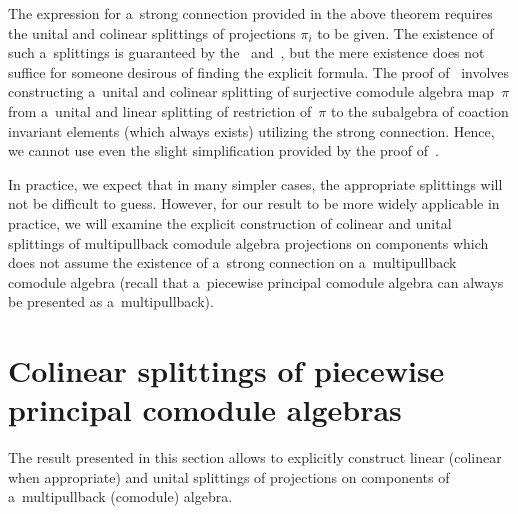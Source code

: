 The expression for a~strong connection provided in the above theorem requires the unital and colinear splittings of
projections $\pi_i$ to be given.
The existence of such a~splittings is guaranteed by the~\cite[Lemma~3.1]{hkmz11} and~\cite[Theorem~3.3]{hkmz11}, but the
mere existence does not suf\/f\/ice for someone desirous of f\/inding the explicit formula.
The proof of~\cite[Lemma~3.1]{hkmz11} involves constructing a~unital and colinear splitting of surjective comodule
algebra map~$\pi$ from a~unital and linear splitting of restriction of~$\pi$ to the subalgebra of coaction invariant
elements (which always exists) utilizing the strong connection.
Hence, we cannot use even the slight simplif\/ication provided by the proof of~\cite[Lemma~3.1]{hkmz11}.

In practice, we expect that in many simpler cases, the appropriate splittings will not be dif\/f\/icult to guess.
However, for our result to be more widely applicable in practice, we will examine the explicit construction of colinear
and unital splittings of multipullback comodule algebra projections on components which does not assume the existence of
a~strong connection on a~multipullback comodule algebra (recall that a~piecewise principal comodule algebra can always
be presented as a~multipullback).

\section{Colinear splittings of piecewise principal comodule algebras}\label{colinear-section}

The result presented in this section allows to explicitly construct linear (colinear when approp\-riate) and unital
splittings of projections on components of a~multipullback (comodule) algebra.

